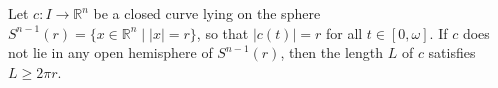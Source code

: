 Let $c: I \to \mathbb{R}^n$ be a closed curve lying on the sphere $S^{n-1}(r) = \{x \in \mathbb{R}^n \mid |x| = r\}$, so that $|c(t)| = r$ for all $t \in [0, \omega]$. If $c$ does not lie in any open hemisphere of $S^{n-1}(r)$, then the length $L$ of $c$ satisfies $L \geq 2\pi r$.
